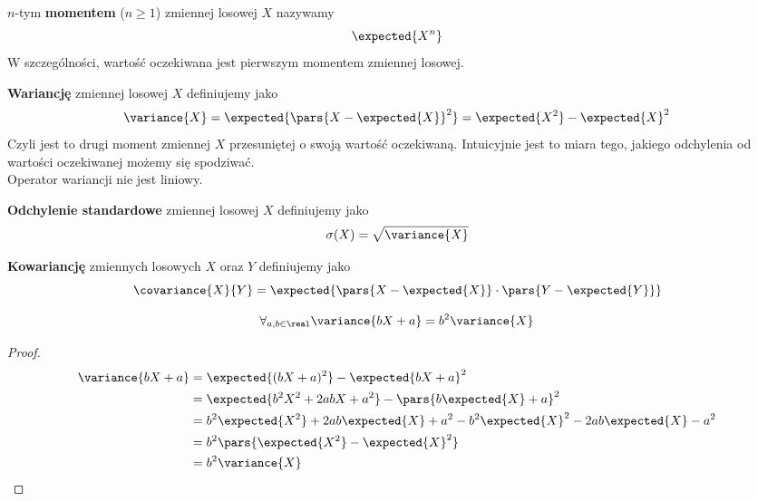 \begin{definition}
	\(n\)-tym \textbf{momentem} (\(n \geq 1\)) zmiennej losowej \( X \) nazywamy 
	\[
		\expected{X^n}
	\]
	W szczególności, wartość oczekiwana jest pierwszym momentem zmiennej losowej.
\end{definition}

\begin{definition}
	\textbf{Wariancję} zmiennej losowej \( X \) definiujemy jako
	\[
		\variance{X} = \expected{\pars{X - \expected{X}}^2} = \expected{X^2} - \expected{X}^2
	\]
	Czyli jest to drugi moment zmiennej \(X\) przesuniętej o swoją wartość oczekiwaną.
	Intuicyjnie jest to miara tego, jakiego odchylenia od wartości oczekiwanej możemy się spodziwać. \\
	Operator wariancji nie jest liniowy.
\end{definition}
\begin{definition} \textbf{Odchylenie standardowe} zmiennej losowej \(X\) definiujemy jako
	\[
		\sigma(X) = \sqrt{\variance{X}}
	\]
\end{definition}
\begin{definition}
	\textbf{Kowariancję} zmiennych losowych \( X \) oraz \( Y \) definiujemy jako
	\[
		\covariance{X}{Y} = \expected{\pars{X - \expected{X}} \cdot \pars{Y - \expected{Y}}}
	\]
\end{definition}

\begin{theorem}
	\[
		\forall_{a, b \in \real} \variance{bX + a} = b^2\variance{X}
	\]
\end{theorem}
\begin{proof}
	\begin{align*}
		\variance{bX + a}
		 & = \expected{(bX + a)^2} - \expected{bX + a}^2                                           \\
		 & = \expected{b^2X^2 + 2abX + a^2} - \pars{b\expected{X} + a}^2                           \\
		 & = b^2\expected{X^2} + 2ab\expected{X} + a^2 - b^2\expected{X}^2 - 2ab\expected{X} - a^2 \\
		 & = b^2\pars{\expected{X^2} - \expected{X}^2}                                             \\
		 & = b^2\variance{X}
	\end{align*}
\end{proof}

